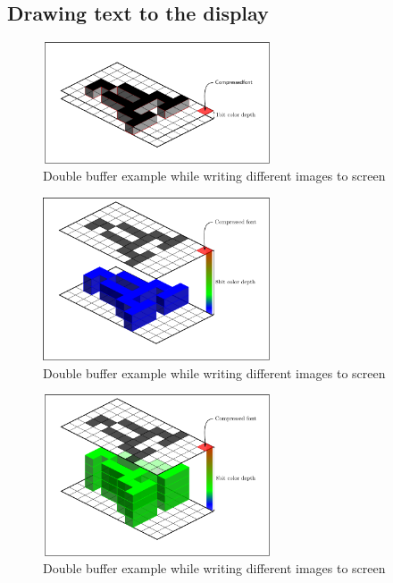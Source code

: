 \subsection{Drawing text to the display}

\begin{figure}[H]
	\centering
	\includegraphics[width=0.6\textwidth]{2-theory/drawing-graphics/graphics/drawingfont.pdf}
	\caption{Double buffer example while writing different images to screen\label{theory:font1bit}}
\end{figure}
\begin{figure}[H]
	\centering
	\includegraphics[width=0.6\textwidth]{2-theory/drawing-graphics/graphics/drawingfont8blue.pdf}
	\caption{Double buffer example while writing different images to screen\label{theory:fontgreen}}
\end{figure}
\begin{figure}[H]
	\centering
	\includegraphics[width=0.6\textwidth]{2-theory/drawing-graphics/graphics/drawingfont8green.pdf}
	\caption{Double buffer example while writing different images to screen\label{theory:fontblue}}
\end{figure}

